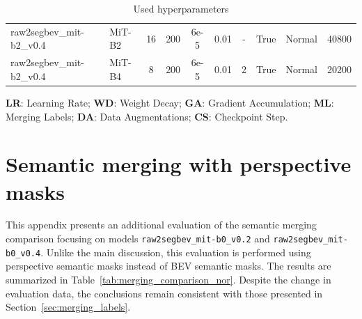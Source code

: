 \begin{table}[h!]
\begin{threeparttable}
\begin{tabular}{l l | c c c c c c c c}
            raw2segbev\_mit-b2\_v0.4 & MiT-B2 & 16 & 200 & 6e-5 & 0.01 & - & True & Normal & 40800 \\

            raw2segbev\_mit-b2\_v0.4 & MiT-B4 & 8 & 200 & 6e-5 & 0.01 & 2 & True & Normal & 20200 \\

            \bottomrule
        \end{tabular}
        \begin{tablenotes} %
            \item[] \textbf{LR}: Learning Rate; \textbf{WD}: Weight Decay; \textbf{GA}: Gradient Accumulation; \textbf{ML}: Merging Labels; \textbf{DA}: Data Augmentations; \textbf{CS}: Checkpoint Step.
        \end{tablenotes} %
    \end{threeparttable} %

    \caption{Used hyperparameters}
    \label{tab:models_hyperparameters}
\end{table}
\newpage


\section{Semantic merging with perspective masks}
This appendix presents an additional evaluation of the semantic merging comparison focusing on models \texttt{raw2segbev\_mit-b0\_v0.2} and \texttt{raw2segbev\_mit-b0\_v0.4}. Unlike the main discussion, this evaluation is performed using perspective semantic masks instead of BEV semantic masks. The results are summarized in Table~\ref{tab:merging_comparison_nor}. Despite the change in evaluation data, the conclusions remain consistent with those presented in Section~\ref{sec:merging_labels}.

